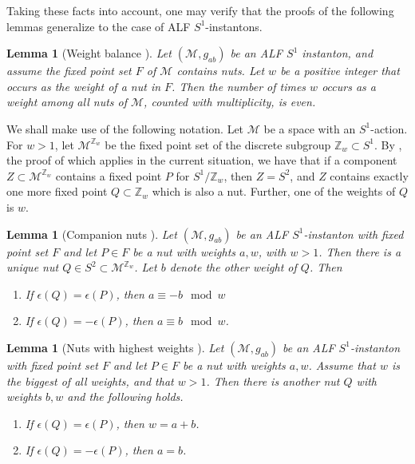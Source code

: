\documentclass[a4paper,10pt,reqno]{amsart}
\newcommand{\nut}{P}
\newcommand{\cM}{\mathcal{M}}
\theoremstyle{plain}
\newtheorem{lemma}[thm]{Lemma}
\newcommand{\Zbb}{\mathbb{Z}}
\newcommand{\eps}{\epsilon}
\newcommand{\Fixed}{F}
\numberwithin{equation}{section}
\begin{document}
Taking these facts into account, one may verify that the proofs of the following lemmas generalize to the case of ALF $S^1$-instantons. 

\begin{lemma}[Weight balance ] \label{lem:2.6} Let $(\cM, g_{ab})$ be an ALF $S^1$ instanton, and assume the fixed point set $\Fixed$ of $\cM$ contains nuts. Let $w$ be a positive integer that occurs as the weight of a nut in $\Fixed$. Then the number of times $w$ occurs as a weight among all nuts of $\cM$, counted with multiplicity, is even. 
\end{lemma} 
We shall make use of the following notation. Let $\cM$ be a space with an $S^1$-action. For $w >1$, let $\cM^{\Zbb_w}$ be the fixed point set of the discrete subgroup $\Zbb_w \subset S^1$. By \cite[Lemma 2.2]{2018JGP...133..181J}, the proof of which applies in the current situation,  we have that if a component $Z \subset \cM^{\Zbb_w}$ contains a fixed point $\nut$ for $S^1/\Zbb_w$, then $Z = S^2$, and $Z$ contains exactly one more fixed point $Q \subset \Zbb_w$ which is also a nut. Further, one of the weights of $Q$ is $w$. 
\begin{lemma}[Companion nuts ] \label{lem:3.5}
Let $(\cM, g_{ab})$ be an ALF $S^1$-instanton with fixed point set $\Fixed$ and let $\nut \in \Fixed$ be a nut with weights $a,w$, with $w > 1$. Then there is a unique nut $Q \in S^2 \subset \cM^{\Zbb_w}$. Let $b$ denote the other weight of $Q$. Then 
\begin{enumerate} 
\item 
If $\eps(Q) = \eps(\nut)$, then $a \equiv -b \mod w$
\item 
If $\eps(Q) = - \eps(\nut)$, then $a \equiv b \mod w$. 
\end{enumerate} 
\end{lemma} 

\begin{lemma}[Nuts with highest weights ] 
\label{lem:3.6}
Let $(\cM, g_{ab})$ be an ALF $S^1$-instanton with fixed point set $\Fixed$ and let $\nut \in \Fixed$ be a nut with weights $a,w$. Assume that $w$ is the biggest of all weights, and that $w>1$. Then there is another nut $Q$ with weights $b,w$ and the following holds.  
\begin{enumerate} 
\item 
If $\eps(Q) = \eps(\nut)$, then $w=a+b$.
\item 
If $\eps(Q) = - \eps(\nut)$, then $a=b$.
\end{enumerate} 
\end{lemma} 
\end{document}
